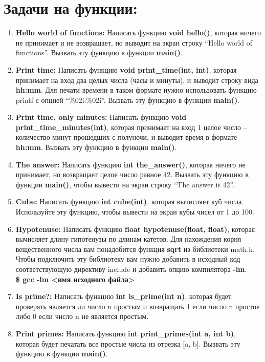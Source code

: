 \documentclass{article}
\begin{document}

\section*{Задачи на функции:}

\begin{enumerate}
\item \textbf{Hello world of functions:} Написать функцию \textbf{void hello()}, которая ничего не принимает и не возвращает, но выводит на экран строку ``Hello world of functions''. Вызвать эту функцию в функции \textbf{main()}.
\item \textbf{Print time:} Написать функцию \textbf{void print\_time(int, int)}, которая принимает на вход два целых числа (часы и минуты), и выводит строку вида \textbf{hh:mm}. Для печати времени в таком формате нужно использовать функцию printf с опцией ``\%02i:\%02i''. Вызвать эту функцию в функции \textbf{main()}.
\item \textbf{Print time, only minutes:} Написать функцию \textbf{void print\_time\_minutes(int)}, которая принимает на вход 1 целое число -- количество минут прошедших с полуночи, и выводит время в формате \textbf{hh:mm}. Вызвать эту функцию в функции \textbf{main()}.
\item \textbf{The answer:} Написать функцию \textbf{int the\_answer()}, которая ничего не принимает, но возвращает целое число равное 42. Вызвать эту функцию в функции \textbf{main()}, чтобы вывести на экран строку ``The answer is 42''.
\item \textbf{Cube:} Написать функцию \textbf{int cube(int)}, которая вычисляет куб числа. Используйте эту функцию, чтобы вывести на экран кубы чисел от 1 до 100.
\item \textbf{Hypotenuse:} Написать функцию \textbf{float hypotenuse(float, float)}, которая вычисляет длину гипотенузы по длинам катетов. Для нахождения корня вещественного числа вам понадобится функция \textbf{sqrt} из библиотеки math.h. Чтобы подключить эту библиотеку вам нужно добавить в исходный код соответствующую директиву include и добавить опцию компилятора \textbf{-lm}. \\ \textbf{\$ gcc -lm <имя исходного файла>}
\item \textbf{Is prime?:} Написать функцию \textbf{int is\_prime(int n)}, которая будет проверять является ли число n простым и возвращать 1 если число n простое либо 0 если число n не является простым.
\item \textbf{Print primes:} Написать функцию \textbf{int print\_primes(int a, int b)}, которая будет печатать все простые числа из отрезка [a, b]. Вызвать эту функцию в функции \textbf{main()}.

\end{enumerate}
\end{document}
